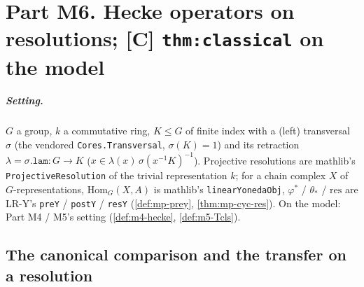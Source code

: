 
\chapter{Part M6. Hecke operators on resolutions; \texorpdfstring{[C] \texttt{thm:classical}}{[C] thm:classical} on the model}\label{ch:m6}

\paragraph{Setting.} $G$ a group, $k$ a commutative ring, $K\le G$ of finite index with a (left) transversal $\sigma$ (the vendored
\texttt{Cores.Transversal}, $\sigma(K)=1$) and its retraction $\lambda=\sigma.\texttt{lam}\colon G\to K$ ($x\in\lambda(x)\,\sigma(x^{-1}K)^{-1}$).
Projective resolutions are mathlib's \texttt{ProjectiveResolution} of the trivial representation $k$; for a chain complex $X$ of
$G$-representations, $\mathrm{Hom}_G(X,A)$ is mathlib's \texttt{linearYonedaObj}, $\varphi^*$ / $\theta_*$ / $\mathrm{res}$ are
LR-Y's \texttt{preY} / \texttt{postY} / \texttt{resY} (\ref{def:mp-prey}, \ref{thm:mp-cyc-res}). On the model: Part M4 / M5's setting
(\ref{def:m4-hecke}, \ref{def:m5-Tcls}).

\section{The canonical comparison and the transfer on a resolution}

